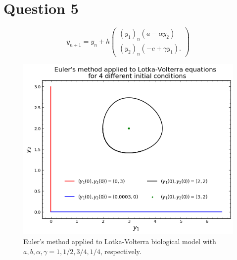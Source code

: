 \documentclass[
	12pt,
	]{article}
\theoremstyle{definition}
\theoremstyle{definition}
\theoremstyle{definition}
\theoremstyle{definition}
\theoremstyle{definition}
\theoremstyle{example}
\theoremstyle{note}
\theoremstyle{remark}
\theoremstyle{example}
\begin{document}
			\section*{Question 5}
				\begin{equation*}
					y_{n+1} = y_{n} + h \begin{pmatrix}
						(y_{1})_{n} (a-\alpha y_{2}) \\ (y_{2})_{n} (-c + \gamma y_{1}).
					\end{pmatrix}
				\end{equation*}
				\begin{figure}[H]
					\centering 
					\includegraphics[width = 0.8\linewidth]{MATH325_Ass5_Fig2.png}
					\captionsetup{margin=1.5cm ,justification = raggedright}
					\caption{Euler's method applied to Lotka-Volterra biological model with $a,b,\alpha, \gamma = 1,1/2, 3/4, 1/4$, respectively.}
				\end{figure}
				\vspace{-0.6cm}
\end{document}
